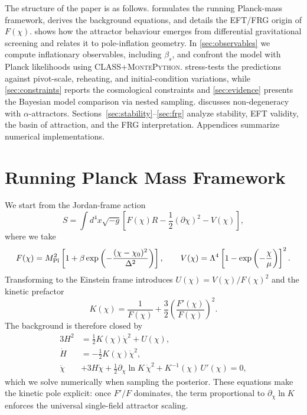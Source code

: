 \documentclass[11pt,a4paper]{article}
\begin{document}
The structure of the paper is as follows.  formulates the running Planck-mass framework, derives the background equations, and details the EFT/FRG origin of $F(\chi)$.  shows how the attractor behaviour emerges from differential gravitational screening and relates it to pole-inflation geometry. In \cref{sec:observables} we compute inflationary observables, including $\beta_s$, and confront the model with Planck likelihoods using \textsc{CLASS}+\textsc{MontePython}.  stress-tests the predictions against pivot-scale, reheating, and initial-condition variations, while \cref{sec:constraints} reports the cosmological constraints and \cref{sec:evidence} presents the Bayesian model comparison via nested sampling.  discusses non-degeneracy with $\alpha$-attractors. Sections~\ref{sec:stability}--\ref{sec:frg} analyze stability, EFT validity, the basin of attraction, and the FRG interpretation. Appendices summarize numerical implementations.

\section{Running Planck Mass Framework}
\label{sec:framework}
We start from the Jordan-frame action
\begin{equation}
S=\int d^{4}x\sqrt{-g}\left[ F(\chi)R-\frac{1}{2}(\partial\chi)^2-V(\chi) \right],
\end{equation}
where we take
\begin{equation}
F(\chi)=M_{\rm Pl}^{2}\left[1+\beta\exp\left(-\frac{(\chi-\chi_{0})^{2}}{\Delta^{2}}\right)\right], \qquad V(\chi)=\Lambda^{4}\left[1-\exp\left(-\frac{\chi}{\mu}\right)\right]^{2}.
\end{equation}
Transforming to the Einstein frame introduces $U(\chi)=V(\chi)/F(\chi)^{2}$ and the kinetic prefactor
\begin{equation}
K(\chi)=\frac{1}{F(\chi)}+\frac{3}{2}\left(\frac{F'(\chi)}{F(\chi)}\right)^{2}.
\end{equation}
The background is therefore closed by
\begin{align}
3H^{2} &= \frac{1}{2}K(\chi)\dot{\chi}^{2}+U(\chi), \label{eq:friedmann}\\
\dot{H} &= -\frac{1}{2}K(\chi)\dot{\chi}^{2}, \label{eq:raychaudhuri}\\
\ddot{\chi} &+3H\dot{\chi}+\frac{1}{2}\partial_{\chi}\ln K\,\dot{\chi}^{2}+K^{-1}(\chi)\,U'(\chi)=0, \label{eq:field}
\end{align}
which we solve numerically when sampling the posterior. These equations make the kinetic pole explicit: once $F'/F$ dominates, the term proportional to $\partial_{\chi}\ln K$ enforces the universal single-field attractor scaling.
\end{document}
